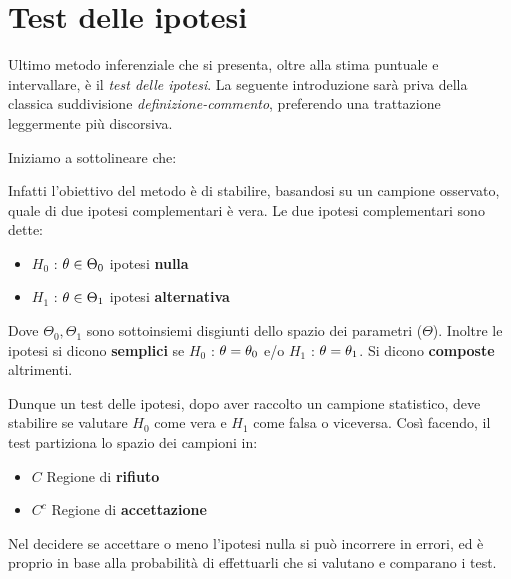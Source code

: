 \section{Test delle ipotesi}

Ultimo metodo inferenziale che si presenta, oltre alla stima puntuale e intervallare, è il \textit{test delle ipotesi}. La seguente introduzione sarà priva della classica suddivisione \textit{definizione-commento}, preferendo una trattazione leggermente più discorsiva.

Iniziamo a sottolineare che:
\begin{center}
\end{center}

Infatti l'obiettivo del metodo è di stabilire, basandosi su un campione osservato, quale di due ipotesi complementari è vera.
\vspace{5px}
Le due ipotesi complementari sono dette:
\begin{itemize}
    \item $H_0$ : $\theta\in\Theta_0$ ipotesi \textbf{nulla}
    \item $H_1$ : $\theta\in\Theta_1$ ipotesi \textbf{alternativa}
\end{itemize}
Dove $\Theta_0,\Theta_1$ sono sottoinsiemi disgiunti dello spazio dei parametri ($\Theta$). Inoltre le ipotesi si dicono \textbf{semplici} se $H_0$ : $\theta = \theta_0$ e/o $H_1$ : $\theta = \theta_1$. Si dicono \textbf{composte} altrimenti.

Dunque un test delle ipotesi, dopo aver raccolto un campione statistico, deve stabilire se valutare $H_0$ come vera e $H_1$ come falsa o viceversa. Così facendo, il test partiziona lo spazio dei campioni in:
\begin{itemize}
    \item $C$ Regione di \textbf{rifiuto}
    \item $C^c$ Regione di \textbf{accettazione}
\end{itemize}

Nel decidere se accettare o meno l'ipotesi nulla si può incorrere in errori, ed è proprio in base alla probabilità di effettuarli che si valutano e comparano i test.

